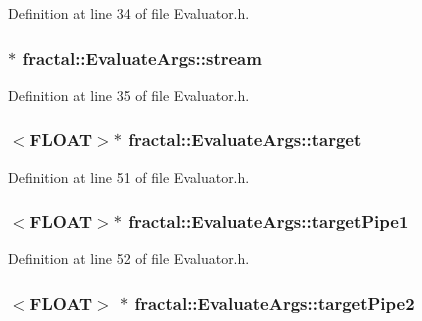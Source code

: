 Definition at line 34 of file Evaluator.\+h.

\hypertarget{classfractal_1_1EvaluateArgs_a5753c9c7878403d1d72f2f6fa248345d}{
\subsubsection[{stream}]{$\ast$ fractal\+::\+Evaluate\+Args\+::stream}}\label{classfractal_1_1EvaluateArgs_a5753c9c7878403d1d72f2f6fa248345d}


Definition at line 35 of file Evaluator.\+h.

\hypertarget{classfractal_1_1EvaluateArgs_a95bd723535f23bee00ea69b3f5e6757e}{
\subsubsection[{target}]{$<${\bf F\+L\+O\+A\+T}$>$$\ast$ fractal\+::\+Evaluate\+Args\+::target}}\label{classfractal_1_1EvaluateArgs_a95bd723535f23bee00ea69b3f5e6757e}


Definition at line 51 of file Evaluator.\+h.

\hypertarget{classfractal_1_1EvaluateArgs_abbb5bcd9a0f6ac125ba51bb0d1549734}{
\subsubsection[{target\+Pipe1}]{$<${\bf F\+L\+O\+A\+T}$>$$\ast$ fractal\+::\+Evaluate\+Args\+::target\+Pipe1}}\label{classfractal_1_1EvaluateArgs_abbb5bcd9a0f6ac125ba51bb0d1549734}


Definition at line 52 of file Evaluator.\+h.

\hypertarget{classfractal_1_1EvaluateArgs_a5503443ded604e0f95343f3b6194467b}{
\subsubsection[{target\+Pipe2}]{$<${\bf F\+L\+O\+A\+T}$>$ $\ast$ fractal\+::\+Evaluate\+Args\+::target\+Pipe2}}\label{classfractal_1_1EvaluateArgs_a5503443ded604e0f95343f3b6194467b}


